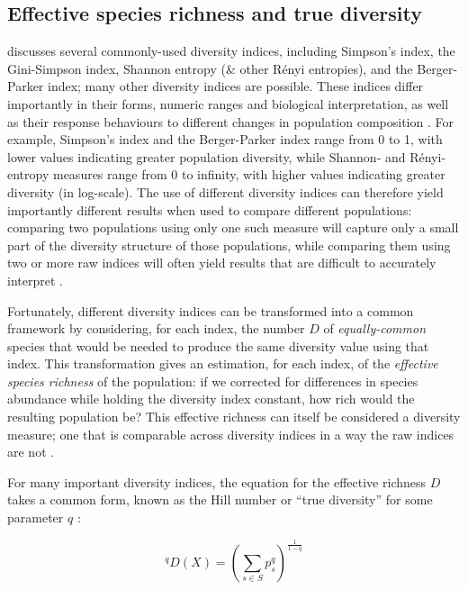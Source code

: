 \subsection{Effective species richness and true diversity}
\label{app:diversity-unitary-hill}

 discusses several commonly-used diversity indices, including Simpson's index, the Gini-Simpson index, Shannon entropy (\& other R\'{e}nyi entropies), and the Berger-Parker index; many other diversity indices are possible. These indices differ importantly in their forms, numeric ranges and biological interpretation, as well as their response behaviours to different changes in population composition \citep{peet1974diversity, jost2006entropy}. For example, Simpson's index and the Berger-Parker index range from 0 to 1, with lower values indicating greater population diversity, while Shannon- and R\'{e}nyi-entropy measures range from 0 to infinity, with higher values indicating greater diversity (in log-scale). The use of different diversity indices can therefore yield importantly different results when used to compare different populations: comparing two populations using only one such measure will capture only a small part of the diversity structure of those populations, while comparing them using two or more raw indices will often yield results that are difficult to accurately interpret \citep{peet1974diversity, jost2006entropy}.

Fortunately, different diversity indices can be transformed into a common framework by considering, for each index, the number $D$ of \textit{equally-common} species that would be needed to produce the same diversity value using that index. This transformation gives an estimation, for each index, of the \textit{effective species richness} of the population: if we corrected for differences in species abundance while holding the diversity index constant, how rich would the resulting population be? This effective richness can itself be considered a diversity measure; one that is comparable across diversity indices in a way the raw indices are not \citep{jost2006entropy}.

For many important diversity indices, the equation for the effective richness $D$ takes a common form, known as the Hill number or ``true diversity'' for some parameter $q$ \citep{hill1973diversity, jost2006entropy}:

\begin{equation}
^qD(X) = \left(\sum_{s \in S} p_s^q \right)^{\frac{1}{1-q}}
\label{eq:hill_index}
\end{equation}

